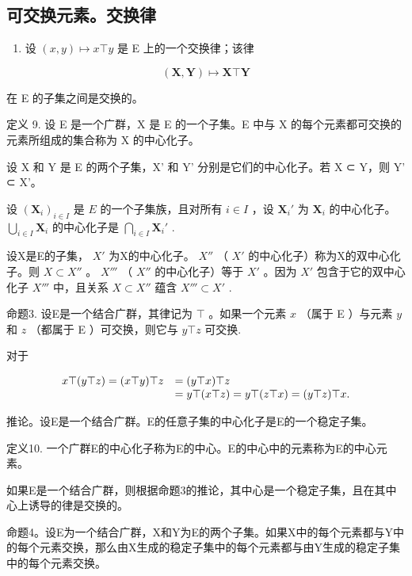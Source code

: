 \subsection{可交换元素。交换律}

\begin{enumerate}
\def\labelenumi{(\arabic{enumi})}
\setcounter{enumi}{3}
\tightlist
\item
  设 \((x, y) \mapsto x \top y\) 是 E 上的一个交换律；该律
\end{enumerate}

\[
(\mathbf {X}, \mathbf {Y}) \mapsto \mathbf {X} \top \mathbf {Y}
\]

在 E 的子集之间是交换的。

定义 9. 设 E 是一个广群，X 是 E 的一个子集。E 中与 X 的每个元素都可交换的元素所组成的集合称为 X 的中心化子。

设 X 和 Y 是 E 的两个子集，X' 和 Y' 分别是它们的中心化子。若 X ⊂ Y，则 Y' ⊂ X'。

设 \((\mathbf{X}_i)_{i\in I}\) 是 \(E\) 的一个子集族，且对所有 \(i\in I\) ，设 \(\mathbf{X}_i'\) 为 \(\mathbf{X}_i\) 的中心化子。 \(\bigcup_{i\in I}\mathbf{X}_i\) 的中心化子是 \(\bigcap_{i\in I}\mathbf{X}_i'\) .

设X是E的子集， \(X'\) 为X的中心化子。 \(X''\) （ \(X'\) 的中心化子）称为X的双中心化子。则 \(X \subset X''\) 。 \(X'''\) （ \(X''\) 的中心化子）等于 \(X'\) 。因为 \(X'\) 包含于它的双中心化子 \(X'''\) 中，且关系 \(X \subset X''\) 蕴含 \(X''' \subset X'\) .

命题3. 设E是一个结合广群，其律记为 \(\top\) 。如果一个元素 \(x\) （属于 E ）与元素 \(y\) 和 \(z\) （都属于 E ）可交换，则它与 \(y \top z\) 可交换.

对于

\[
\begin{array}{r l} x \top (y \top z) = (x \top y) \top z & = (y \top x) \top z \\ & = y \top (x \top z) = y \top (z \top x) = (y \top z) \top x. \end{array}
\]

推论。设E是一个结合广群。E的任意子集的中心化子是E的一个稳定子集。

定义10. 一个广群E的中心化子称为E的中心。E的中心中的元素称为E的中心元素。

如果E是一个结合广群，则根据命题3的推论，其中心是一个稳定子集，且在其中心上诱导的律是交换的。

命题4。设E为一个结合广群，X和Y为E的两个子集。如果X中的每个元素都与Y中的每个元素交换，那么由X生成的稳定子集中的每个元素都与由Y生成的稳定子集中的每个元素交换。

